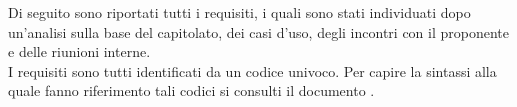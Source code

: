 
Di seguito sono riportati tutti i requisiti, i quali sono stati individuati dopo un'analisi sulla base del capitolato, dei casi d'uso, degli incontri con il proponente e delle riunioni interne.\\
I requisiti sono tutti identificati da un codice univoco. Per capire la sintassi alla quale fanno riferimento tali codici si consulti il documento .

%



%




